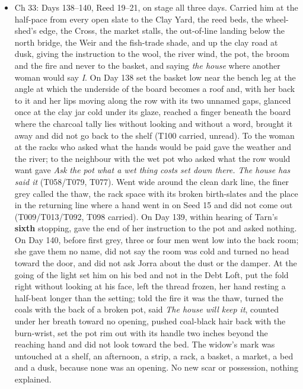 \documentclass{design/chronicle}
\begin{document}
{\begin{itemize}[leftmargin=1.4em,itemsep=1pt,topsep=3pt,parsep=0pt]
\item Ch 33: Days 138–140, Reed 19–21, on stage all three days. Carried him at the half-pace from every open slate to the Clay Yard, the reed beds, the wheel-shed’s edge, the Cross, the market stalls, the out-of-line landing below the north bridge, the Weir and the fish-trade shade, and up the clay road at dusk, giving the instruction to the wool, the river wind, the pot, the broom and the fire and never to the basket, and saying \emph{the house} where another woman would say \emph{I}. On Day 138 set the basket low near the bench leg at the angle at which the underside of the board becomes a roof and, with her back to it and her lips moving along the row with its two unnamed gaps, glanced once at the clay jar cold under its glaze, reached a finger beneath the board where the charcoal tally lies without looking and without a word, brought it away and did not go back to the shelf (T100 carried, unread). To the woman at the racks who asked what the hands would be paid gave the weather and the river; to the neighbour with the wet pot who asked what the row would want gave \emph{Ask the pot what a wet thing costs set down there. The house has said it} (T058/T079, T077). Went wide around the clean dark line, the finer grey called the thaw, the rack space with its broken birth-slates and the place in the returning line where a hand went in on Seed 15 and did not come out (T009/T013/T092, T098 carried). On Day 139, within hearing of Tarn’s \textbf{sixth} stopping, gave the end of her instruction to the pot and asked nothing. On Day 140, before first grey, three or four men went low into the back room; she gave them no name, did not say the room was cold and turned no head toward the door, and did not ask Jorra about the dust or the damper. At the going of the light set him on his bed and not in the Debt Loft, put the fold right without looking at his face, left the thread frozen, her hand resting a half-beat longer than the setting; told the fire it was the thaw, turned the coals with the back of a broken pot, said \emph{The house will keep it}, counted under her breath toward no opening, pushed coal-black hair back with the burn-wrist, set the pot rim out with its handle two inches beyond the reaching hand and did not look toward the bed. The widow’s mark was untouched at a shelf, an afternoon, a strip, a rack, a basket, a market, a bed and a dusk, because none was an opening. No new scar or possession, nothing explained.

\end{itemize}

}
\end{document}
